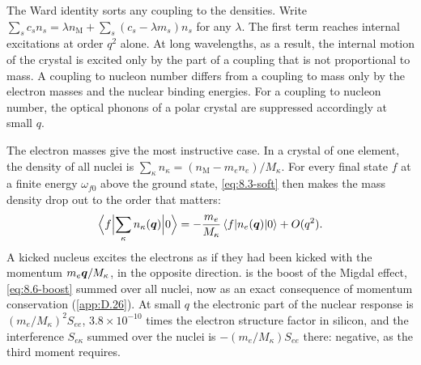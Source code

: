 The Ward identity sorts any coupling to the densities. Write $\sum_sc_sn_s = \lambda n_{\mathrm{M}} + \sum_s(c_s - \lambda m_s)n_s$ for any $\lambda$. The first term reaches internal excitations at order $q^2$ alone. At long wavelengths, as a result, the internal motion of the crystal is excited only by the part of a coupling that is not proportional to mass. A coupling to nucleon number differs from a coupling to mass only by the electron masses and the nuclear binding energies. For a coupling to nucleon number, the optical phonons of a polar crystal are suppressed accordingly at small $q$.

The electron masses give the most instructive case. In a crystal of one element, the density of all nuclei is $\sum_\kappa n_\kappa = (n_{\mathrm{M}} - m_en_e)/M_\kappa$. For every final state $f$ at a finite energy $\omega_{f0}$ above the ground state, \cref{eq:8.3-soft} then makes the mass density drop out to the order that matters:
\begin{equation}
  \Bigl\langle f\Bigl|\sum_\kappa n_\kappa(\bm{q})\Bigr|0\Bigr\rangle = -\frac{m_e}{M_\kappa}\,\langle f|n_e(\bm{q})|0\rangle + O(q^2) .
  \label{eq:8.3-boostward}
\end{equation}
A kicked nucleus excites the electrons as if they had been kicked with the momentum $m_e\bm{q}/M_\kappa$, in the opposite direction.  is the boost of the Migdal effect, \cref{eq:8.6-boost} summed over all nuclei, now as an exact consequence of momentum conservation (\cref{app:D.26}). At small $q$ the electronic part of the nuclear response is $(m_e/M_\kappa)^2S_{ee}$, $3.8\times10^{-10}$ times the electron structure factor in silicon, and the interference $S_{e\kappa}$ summed over the nuclei is $-(m_e/M_\kappa)S_{ee}$ there: negative, as the third moment requires.

